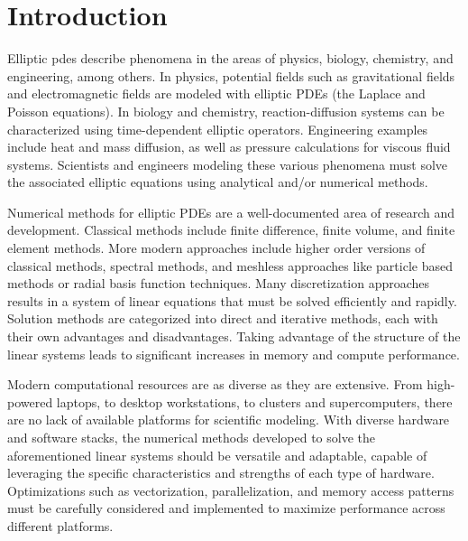 \section{Introduction}

Elliptic \gls{pdes} describe phenomena in the areas of physics, biology, chemistry, and engineering, among others. In physics, potential fields such as gravitational fields and electromagnetic fields are modeled with elliptic PDEs (the Laplace and Poisson equations). In biology and chemistry, reaction-diffusion systems can be characterized using time-dependent elliptic operators. Engineering examples include heat and mass diffusion, as well as pressure calculations for viscous fluid systems. Scientists and engineers modeling these various phenomena must solve the associated elliptic equations using analytical and/or numerical methods.

Numerical methods for elliptic PDEs are a well-documented area of research and development. Classical methods include finite difference, finite volume, and finite element methods. More modern approaches include higher order versions of classical methods, spectral methods, and meshless approaches like particle based methods or radial basis function techniques. Many discretization approaches results in a system of linear equations that must be solved efficiently and rapidly. Solution methods are categorized into direct and iterative methods, each with their own advantages and disadvantages. Taking advantage of the structure of the linear systems leads to significant increases in memory and compute performance.

Modern computational resources are as diverse as they are extensive. From high-powered laptops, to desktop workstations, to clusters and supercomputers, there are no lack of available platforms for scientific modeling. With diverse hardware and software stacks, the numerical methods developed to solve the aforementioned linear systems should be versatile and adaptable, capable of leveraging the specific characteristics and strengths of each type of hardware. Optimizations such as vectorization, parallelization, and memory access patterns must be carefully considered and implemented to maximize performance across different platforms.


